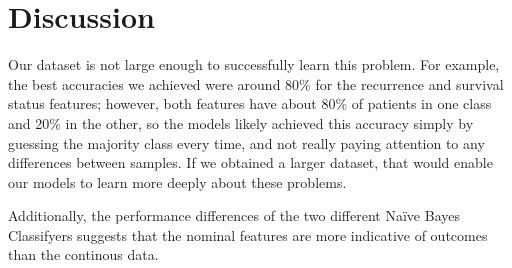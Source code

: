\documentclass{article}
\begin{document}
\section{Discussion}

Our dataset is not large enough to successfully learn this problem. For example, the best accuracies we achieved were around 80\% for the recurrence and survival status features; however, both features have about 80\% of patients in one class and 20\% in the other, so the models likely achieved this accuracy simply by guessing the majority class every time, and not really paying attention to any differences between samples. If we obtained a larger dataset, that would enable our models to learn more deeply about these problems.

Additionally, the performance differences of the two different Naïve Bayes Classifyers suggests that the nominal features are more indicative of outcomes than the continous data.



\end{document}
